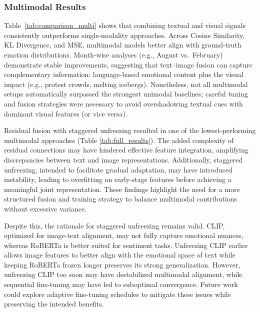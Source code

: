 \subsubsection*{Multimodal Results}
Table~\ref{tab:comparison_multi} shows that combining textual and visual signals consistently outperforms single-modality approaches. Across Cosine Similarity, KL Divergence, and MSE, multimodal models better align with ground-truth emotion distributions. Month-wise analyses (e.g., August vs.\ February) demonstrate stable improvements, suggesting that text--image fusion can capture complementary information: language-based emotional content plus the visual impact (e.g., protest crowds, melting icebergs). Nonetheless, not all multimodal setups automatically surpassed the strongest unimodal baselines; careful tuning and fusion strategies were necessary to avoid overshadowing textual cues with dominant visual features (or vice versa).
\newline

Residual fusion with staggered unfreezing resulted in one of the lowest-performing multimodal approaches (Table \ref{tab:full_results}). The added complexity of residual connections may have hindered effective feature integration, amplifying discrepancies between text and image representations. Additionally, staggered unfreezing, intended to facilitate gradual adaptation, may have introduced instability, leading to overfitting on early-stage features before achieving a meaningful joint representation. These findings highlight the need for a more structured fusion and training strategy to balance multimodal contributions without excessive variance.
\newline

Despite this, the rationale for staggered unfreezing remains valid. CLIP, optimized for image-text alignment, may not fully capture emotional nuances, whereas RoBERTa is better suited for sentiment tasks. Unfreezing CLIP earlier allows image features to better align with the emotional space of text while keeping RoBERTa frozen longer preserves its strong generalization. However, unfreezing CLIP too soon may have destabilized multimodal alignment, while sequential fine-tuning may have led to suboptimal convergence. Future work could explore adaptive fine-tuning schedules to mitigate these issues while preserving the intended benefits.

